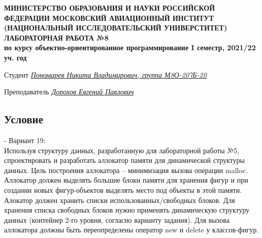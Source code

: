 \documentclass[12pt]{article}
\begin{document}
\begin{titlepage}
\begin{center}
\textbf{МИНИСТЕРСТВО ОБРАЗОВАНИЯ И НАУКИ РОССИЙСКОЙ ФЕДЕРАЦИИ
\medskip
МОСКОВСКИЙ АВИАЦИОННЫЙ ИНСТИТУТ
(НАЦИОНАЛЬНЫЙ ИССЛЕДОВАТЕЛЬСКИЙ УНИВЕРСТИТЕТ)
\vfill\vfill
{\Huge ЛАБОРАТОРНАЯ РАБОТА №8} \\
по курсу объектно-ориентированное программирование
I семестр, 2021/22 уч. год}
\end{center}
\vfill

Студент \uline{\it {Пономарев Никита Владимирович, группа М8О-207Б-20}\hfill}

Преподаватель \uline{\it {Дорохов Евгений Павлович}\hfill}

\vfill
\end{titlepage}

\subsection*{Условие}
 - Вариант 19:\\
Используя структуру данных, разработанную для лабораторной работы №5, спроектировать и 
разработать аллокатор памяти для динамической структуры данных.
Цель построения аллокатора – минимизация вызова операции malloc. Аллокатор должен 
выделять большие блоки памяти для хранения фигур и при создании новых фигур-объектов 
выделять место под объекты в этой памяти.
Алокатор должен хранить списки использованных/свободных блоков. Для хранения списка 
свободных блоков нужно применять динамическую структуру данных (контейнер 2-го уровня, 
согласно варианту задания).
Для вызова аллокатора должны быть переопределены оператор new и delete у классов-фигур.
\end{document}
